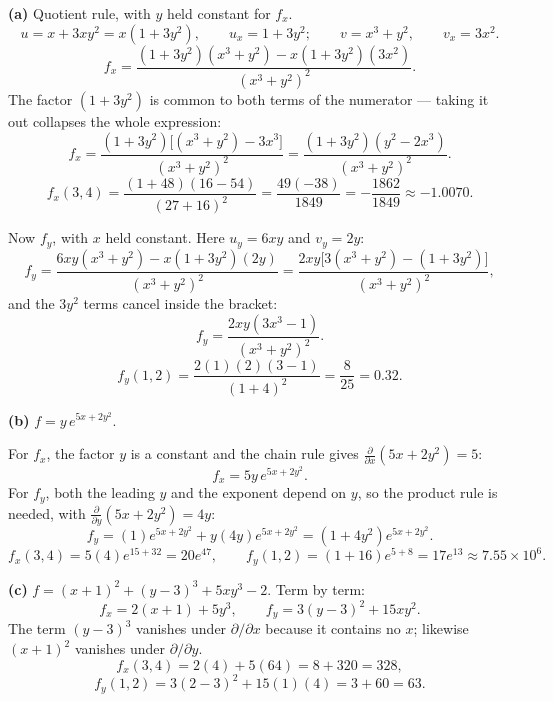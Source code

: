\begin{solution}
\textbf{(a)} Quotient rule, with $y$ held constant for $f_x$.
\[
u=x+3xy^{2}=x(1+3y^{2}),\qquad u_x=1+3y^{2};\qquad
v=x^{3}+y^{2},\qquad v_x=3x^{2}.
\]
\[
f_x=\frac{(1+3y^{2})(x^{3}+y^{2})-x(1+3y^{2})(3x^{2})}{(x^{3}+y^{2})^{2}} .
\]
The factor $(1+3y^{2})$ is common to both terms of the numerator --- taking it
out collapses the whole expression:
\[
f_x=\frac{(1+3y^{2})\bigl[(x^{3}+y^{2})-3x^{3}\bigr]}{(x^{3}+y^{2})^{2}}
=\frac{(1+3y^{2})(y^{2}-2x^{3})}{(x^{3}+y^{2})^{2}} .
\]
\[
f_x(3,4)=\frac{(1+48)(16-54)}{(27+16)^{2}}=\frac{49(-38)}{1849}
=-\frac{1862}{1849}\approx -1.0070 .
\]

Now $f_y$, with $x$ held constant. Here $u_y=6xy$ and $v_y=2y$:
\[
f_y=\frac{6xy(x^{3}+y^{2})-x(1+3y^{2})(2y)}{(x^{3}+y^{2})^{2}}
=\frac{2xy\bigl[3(x^{3}+y^{2})-(1+3y^{2})\bigr]}{(x^{3}+y^{2})^{2}},
\]
and the $3y^{2}$ terms cancel inside the bracket:
\[
f_y=\frac{2xy(3x^{3}-1)}{(x^{3}+y^{2})^{2}} .
\]
\[
f_y(1,2)=\frac{2(1)(2)(3-1)}{(1+4)^{2}}=\frac{8}{25}=0.32 .
\]

\medskip
\textbf{(b)} $f=y\,e^{5x+2y^{2}}$.

For $f_x$, the factor $y$ is a constant and the chain rule gives
$\tfrac{\partial}{\partial x}(5x+2y^{2})=5$:
\[
f_x=5y\,e^{5x+2y^{2}} .
\]
For $f_y$, both the leading $y$ and the exponent depend on $y$, so the product
rule is needed, with $\tfrac{\partial}{\partial y}(5x+2y^{2})=4y$:
\[
f_y=(1)e^{5x+2y^{2}}+y(4y)e^{5x+2y^{2}}
=\left(1+4y^{2}\right)e^{5x+2y^{2}} .
\]
\[
f_x(3,4)=5(4)e^{15+32}=20e^{47},\qquad
f_y(1,2)=(1+16)e^{5+8}=17e^{13}\approx 7.55\times10^{6}.
\]

\medskip
\textbf{(c)} $f=(x+1)^{2}+(y-3)^{3}+5xy^{3}-2$. Term by term:
\[
f_x=2(x+1)+5y^{3},\qquad
f_y=3(y-3)^{2}+15xy^{2} .
\]
The term $(y-3)^{3}$ vanishes under $\partial/\partial x$ because it contains no
$x$; likewise $(x+1)^{2}$ vanishes under $\partial/\partial y$.
\[
f_x(3,4)=2(4)+5(64)=8+320=328,
\]
\[
f_y(1,2)=3(2-3)^{2}+15(1)(4)=3+60=63 .
\]

\end{solution}

